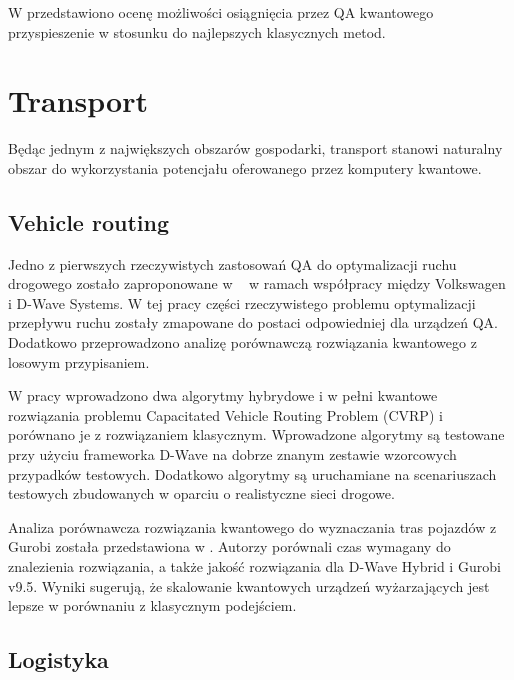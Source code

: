 \documentclass[a4paper,11pt]{article}
\begin{document}
W \cite{crosson2021prospects} przedstawiono ocenę możliwości osiągnięcia przez QA kwantowego przyspieszenie w stosunku do najlepszych klasycznych metod.

\newpage 

\section{Transport}

Będąc jednym z największych obszarów gospodarki, transport stanowi naturalny obszar do wykorzystania potencjału oferowanego przez komputery kwantowe. 

\subsection{Vehicle routing}
Jedno z pierwszych rzeczywistych zastosowań QA do optymalizacji ruchu drogowego zostało zaproponowane w ~\cite{neukart2017traffic} w ramach współpracy między Volkswagen i D-Wave Systems. W tej pracy części rzeczywistego problemu optymalizacji przepływu ruchu zostały zmapowane do postaci odpowiedniej dla urządzeń QA. Dodatkowo przeprowadzono analizę porównawczą rozwiązania kwantowego z losowym przypisaniem.

W pracy \cite{borowski2020new} wprowadzono dwa algorytmy hybrydowe i w pełni kwantowe rozwiązania problemu Capacitated Vehicle Routing Problem (CVRP) i porównano je z rozwiązaniem klasycznym. Wprowadzone algorytmy są testowane przy użyciu frameworka D-Wave na dobrze znanym zestawie wzorcowych przypadków testowych. Dodatkowo algorytmy są uruchamiane na scenariuszach testowych zbudowanych w oparciu o realistyczne sieci drogowe.


Analiza porównawcza rozwiązania kwantowego do wyznaczania tras pojazdów z Gurobi została przedstawiona w \cite{anil2022performance}. Autorzy porównali czas wymagany do znalezienia rozwiązania, a także jakość rozwiązania dla D-Wave Hybrid i Gurobi v9.5. Wyniki sugerują, że skalowanie kwantowych urządzeń wyżarzających jest lepsze w porównaniu z klasycznym podejściem.

\newpage
\subsection{Logistyka}
\end{document}
